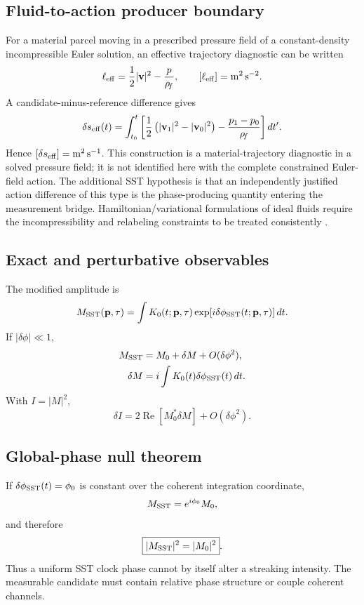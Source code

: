 \subsection{Fluid-to-action producer boundary}
For a material parcel moving in a prescribed pressure field of a constant-density incompressible Euler solution, an effective trajectory diagnostic can be written
\begin{equation}
\ell_{\rm eff}=\frac12|\mathbf v|^2-\frac{p}{\rho_{\!f}},
\qquad
[\ell_{\rm eff}]=\mathrm{m^2\,s^{-2}}.
\end{equation}
A candidate-minus-reference difference gives
\begin{equation}
\delta s_{\rm eff}(t)
=\int_{t_0}^{t}
\left[
\frac12\left(|\mathbf v_1|^2-|\mathbf v_0|^2\right)
-\frac{p_1-p_0}{\rho_{\!f}}
\right]dt'.
\end{equation}
Hence \([\delta s_{\rm eff}]=\mathrm{m^2\,s^{-1}}\). This construction is a material-trajectory diagnostic in a solved pressure field; it is not identified here with the complete constrained Euler-field action. The additional SST hypothesis is that an independently justified action difference of this type is the phase-producing quantity entering the measurement bridge. Hamiltonian/variational formulations of ideal fluids require the incompressibility and relabeling constraints to be treated consistently \cite{Salmon1988Hamiltonian}.

\subsection{Exact and perturbative observables}
The modified amplitude is
\begin{equation}
M_{\rm SST}(\mathbf p,\tau)
=\int K_0(t;\mathbf p,\tau)
\exp\!\left[i\delta\phi_{\rm SST}(t;\mathbf p,\tau)\right]dt.
\end{equation}
If \(|\delta\phi|\ll1\),
\begin{align}
M_{\rm SST}&=M_0+\delta M+O(\delta\phi^2),\\
\delta M&=i\int K_0(t)\delta\phi_{\rm SST}(t)\,dt.
\end{align}
With \(I=|M|^2\),
\begin{equation}
\boxed{
\delta I
=2\operatorname{Re}\!\left[M_0^*\delta M\right]
+O(\delta\phi^2)
}.
\end{equation}

\subsection{Global-phase null theorem}
If \(\delta\phi_{\rm SST}(t)=\phi_0\) is constant over the coherent integration coordinate,
\begin{equation}
M_{\rm SST}=e^{i\phi_0}M_0,
\end{equation}
and therefore
\begin{equation}
\boxed{|M_{\rm SST}|^2=|M_0|^2}.
\end{equation}
Thus a uniform SST clock phase cannot by itself alter a streaking intensity. The measurable candidate must contain relative phase structure or couple coherent channels.

